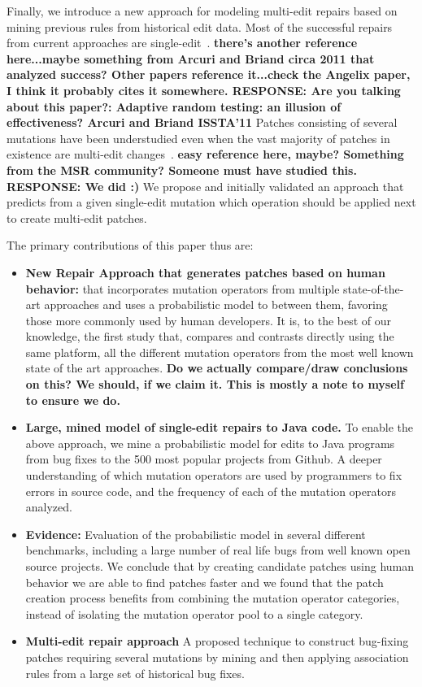 \documentclass[conference]{IEEEtran}
\newcommand{\todo}[1]
  {{\scriptsize \textbf{\color{red} {#1}}}}
\begin{document}
Finally, we introduce a new approach for modeling multi-edit repairs based on
mining previous rules from historical edit data. Most of the
successful repairs from current approaches are
single-edit~\cite{Weimer13,Qi15,kim2013}.\todo{there's another reference
  here...maybe something from Arcuri and Briand circa 2011 that analyzed
  success?  Other papers reference it...check the Angelix paper, I think it
  probably cites it somewhere. RESPONSE: Are you talking about this paper?: Adaptive random testing: an illusion of effectiveness? Arcuri and Briand ISSTA'11}  Patches
consisting of several mutations have been understudied even when the vast majority
of patches in existence are multi-edit changes~\cite{Soto15}.\todo{easy reference here, maybe?
   Something from the MSR community?  Someone must have studied this. RESPONSE: We did :)}  We
 propose and initially validated an approach that predicts from a given 
single-edit mutation which operation should be applied
next to create multi-edit patches. 


The primary contributions of this paper thus are:
\begin{itemize}
  \item \textbf{New Repair Approach that generates patches based on human behavior:} that incorporates mutation operators
    from multiple state-of-the-art approaches and 
    uses a probabilistic model to between them, favoring those more commonly
    used by human developers. It is, to the best of our
    knowledge, the first study that, compares and contrasts directly using the
    same platform, all the different mutation operators from the most well known
    state of the art approaches.  \todo{Do we actually compare/draw conclusions
      on this?  We should, if we claim it.  This is mostly a note to myself to
      ensure we do.} 
    \item \textbf{Large, mined model of single-edit repairs to Java code.} To
      enable the above approach, we mine a probabilistic model for edits to Java programs
    from bug fixes to the 500 most popular projects from
    Github.   A deeper
    understanding of which mutation operators are used by programmers to fix
    errors in source code, and the frequency of each of the mutation operators
    analyzed. 
  \item \textbf{Evidence:} Evaluation of the probabilistic model in several
    different benchmarks, including a large number of real life bugs from well
    known open source projects. We conclude that by creating candidate patches using human behavior we are able to find patches faster and we found that the patch creation process benefits from combining the mutation operator categories, instead of isolating the mutation operator pool to a single category. 
  \item \textbf{Multi-edit repair approach} A proposed technique to construct 
    bug-fixing patches requiring several mutations by mining and then applying association
    rules from a large set of historical bug fixes. 
\end{itemize}
\end{document}

